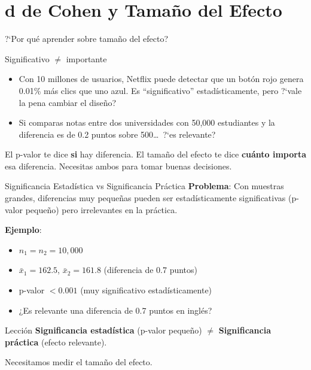 \documentclass[aspectratio=169, 11pt]{beamer}
\begin{document}
\section{d de Cohen y Tamaño del Efecto}

\begin{frame}{?`Por qu\'e aprender sobre tama\~no del efecto?}
\small
\begin{exampleblock}{Significativo $\neq$ importante}
\begin{itemize}\setlength{\itemsep}{2pt}
  \item Con 10 millones de usuarios, Netflix puede detectar que un bot\'on rojo genera 0.01\% m\'as clics que uno azul. Es ``significativo'' estad\'isticamente, pero ?`vale la pena cambiar el dise\~no?
  \item Si comparas notas entre dos universidades con 50{,}000 estudiantes y la diferencia es de 0.2 puntos sobre 500\ldots\ ?`es relevante?
\end{itemize}
\end{exampleblock}

\vspace{0.2cm}
El p-valor te dice \textbf{si} hay diferencia. El tama\~no del efecto te dice \textbf{cu\'anto importa} esa diferencia. Necesitas ambos para tomar buenas decisiones.
\end{frame}

\begin{frame}{Significancia Estadística vs Significancia Práctica}
\textbf{Problema}: Con muestras grandes, diferencias muy pequeñas pueden ser estadísticamente significativas (p-valor pequeño) pero \alert{irrelevantes} en la práctica.

\vspace{0.3cm}
\textbf{Ejemplo}:
\begin{itemize}
  \item $n_1 = n_2 = 10{,}000$
  \item $\bar{x}_1 = 162.5$, $\bar{x}_2 = 161.8$ (diferencia de 0.7 puntos)
  \item p-valor $< 0.001$ (muy significativo estadísticamente)
  \item ¿Es relevante una diferencia de 0.7 puntos en inglés?
\end{itemize}

\vspace{0.3cm}
\begin{alertblock}{Lección}
\textbf{Significancia estadística} (p-valor pequeño) $\neq$ \textbf{Significancia práctica} (efecto relevante).

\vspace{0.2cm}
Necesitamos medir el \alert{tamaño del efecto}.
\end{alertblock}
\end{frame}
\end{document}
